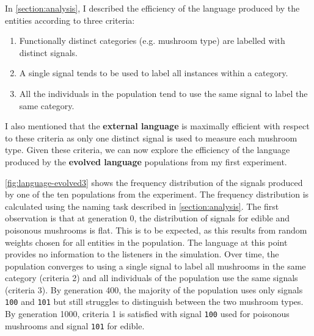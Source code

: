 \documentclass[12pt,a4paper]{report}
\begin{document}
In \cref{section:analysis}, I described the efficiency of the language produced by the entities according to three criteria:

\begin{enumerate}
	\item Functionally distinct categories (e.g. mushroom type) are labelled with distinct signals.
	\item A single signal tends to be used to label all instances within a category.
	\item All the individuals in the population tend to use the same signal to label the same category.
\end{enumerate}

I also mentioned that the {\bf external language} is maximally efficient with respect to these criteria as only one distinct signal is used to measure each mushroom type. Given these criteria, we can now explore the efficiency of the language produced by the {\bf evolved language} populations from my first experiment. 


\cref{fig:language-evolved3} shows the frequency distribution of the signals produced by one of the ten populations from the experiment. The frequency distribution is calculated using the naming task described in \cref{section:analysis}. The first observation is that at generation 0, the distribution of signals for edible and poisonous mushrooms is flat. This is to be expected, as this results from random weights chosen for all entities in the population. The language at this point provides no information to the listeners in the simulation. Over time, the population converges to using a single signal to label all mushrooms in the same category (criteria 2) and all individuals of the population use the same signals (criteria 3). By generation 400, the majority of the population uses only signals \verb~100~ and \verb~101~ but still struggles to distinguish between the two mushroom types. By generation 1000, criteria 1 is satisfied with signal \verb~100~ used for poisonous mushrooms and signal \verb~101~ for edible. 
\end{document}

